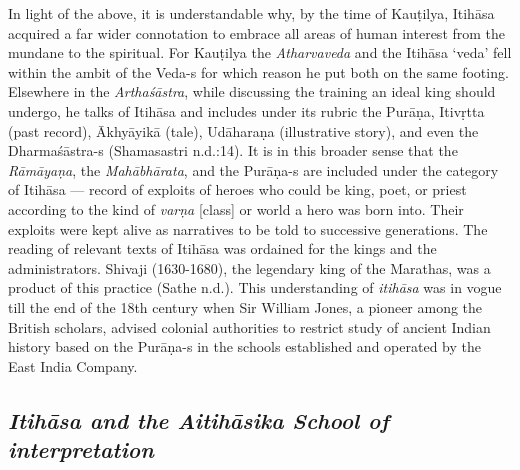 In light of the above, it is understandable why, by the time of Kauṭilya, Itihāsa acquired a far wider connotation to embrace all areas of human interest from the mundane to the spiritual. For Kauṭilya the \textit{Atharvaveda} and the Itihāsa ‘veda’ fell within the ambit of the \hbox{Veda-s} for which reason he put both on the same footing. Elsewhere in the \textit{Arthaśāstra}, while discussing the training an ideal king should undergo, he talks of Itihāsa and includes under its rubric the Purāṇa, Itivṛtta (past record), Ākhyāyikā (tale), Udāharaṇa (illustrative story), and even the Dharmaśāstra-s (Shamasastri n.d.:14). It is in this broader sense that the \textit{Rāmāyaṇa}, the \textit{Mahābhārata}, and the \hbox{Purāṇa-s} are included under the category of Itihāsa — record of exploits of heroes who could be king, poet, or priest according to the kind of \textit{varṇa} [class] or world a hero was born into. Their exploits were kept alive as narratives to be told to successive generations. The reading of relevant texts of Itihāsa was ordained for the kings and the administrators. Shivaji (1630-1680), the legendary king of the Marathas, was a product of this practice (Sathe n.d.). This understanding of \textit{itihāsa} was in vogue till the end of the 18th century when Sir William Jones, a pioneer among the British scholars, advised colonial authorities to restrict study of ancient Indian history based on the Purāṇa-s in the schools established and operated by the East India Company.

\subsection*{\textit{Itihāsa and the Aitihāsika School of interpretation}}

